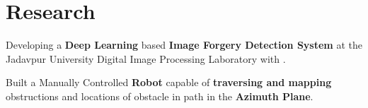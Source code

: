 \documentclass[]{css}
\begin{document}
\begin{minipage}[t]{0.66\textwidth}
\section{Research}

Developing a \textbf{Deep Learning} based \textbf{Image Forgery Detection System} at the Jadavpur University Digital Image Processing Laboratory with  .\\ 
\sectionsep


Built a Manually Controlled \textbf{Robot} capable of \textbf{traversing and mapping} obstructions and locations of obstacle in path in the \textbf{Azimuth Plane}.
\sectionsep





% 
% 

\end{minipage} 
\end{document}

